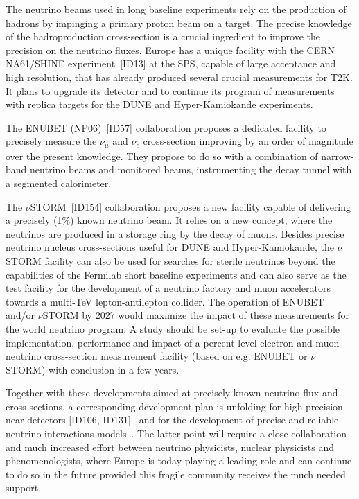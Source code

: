The neutrino beams used in long baseline experiments rely on the production of hadrons by impinging a primary proton beam on a target. The precise knowledge of the hadroproduction cross-section is a crucial ingredient to improve the precision on the neutrino fluxes. Europe has a unique facility with the CERN NA61/SHINE experiment~[ID13] %
at the SPS, capable of large acceptance and high resolution, that has already produced several crucial measurements for T2K. It plans to upgrade its detector and to continue its program of measurements with replica targets for the DUNE and Hyper-Kamiokande experiments. %

The ENUBET (NP06)~[ID57] %
collaboration  proposes a dedicated facility to precisely measure the $\nu_\mu$ and $\nu_e$ cross-section improving by an order of magnitude over the present knowledge. They propose to do so with a combination of narrow-band neutrino beams and monitored beams, instrumenting the decay tunnel with a segmented calorimeter. 


The $\nu$STORM~[ID154] %
collaboration proposes a new facility capable of delivering a precisely (1\%) known neutrino beam. It relies on a new concept, where the neutrinos are produced in a storage ring by the decay of muons. Besides precise neutrino nucleus cross-sections useful for DUNE and Hyper-Kamiokande, the $\nu$STORM facility can also be used for searches for sterile neutrinos beyond the capabilities of the Fermilab short baseline experiments and can also serve as the test facility for the development of  a neutrino factory and muon accelerators
towards a multi-TeV lepton-antilepton collider. The operation of ENUBET and/or $\nu$STORM by 2027 would maximize the impact of these measurements for the world neutrino program. A study should be set-up to evaluate the possible implementation, performance and impact
of a percent-level electron and muon neutrino cross-section measurement facility (based on e.g. ENUBET or $\nu$STORM) with conclusion in a few years.

Together with these developments aimed at precisely known neutrino flux and cross-sections, a corresponding development plan is unfolding for high precision near-detectors [ID106, ID131]~\cite{Abe:2019whr} %
and for the development of precise and reliable neutrino interactions models~\cite{Alvarez-Ruso:2017oui}. The latter point will require a close collaboration and much increased effort between neutrino physicists, nuclear physicists and phenomenologists, where Europe is today playing a leading role and can continue to do so in the future provided this fragile community receives the much needed support.




